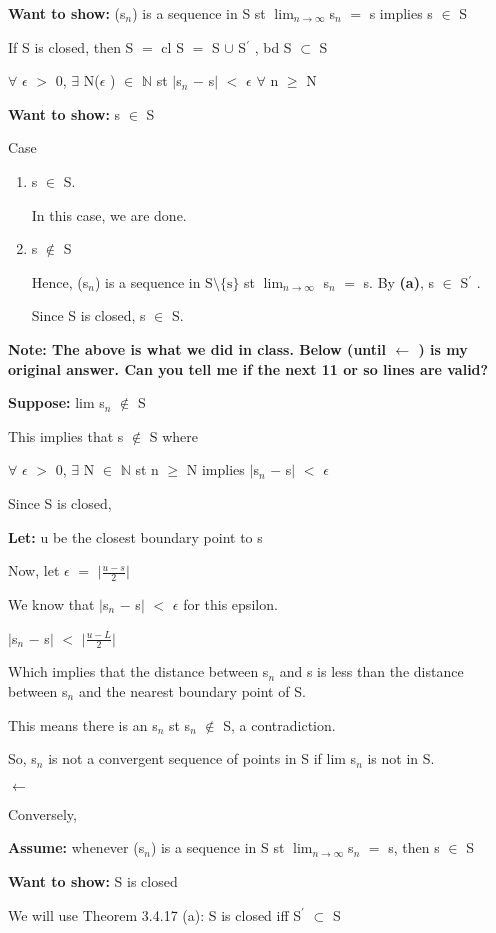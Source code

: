 \documentclass{article}
\newcommand{\mt}[1]{\ensuremath{#1}}
\newcommand{\elist}{\end{enumerate}}
\newcommand{\bilist}{\begin{enumerate}[label=\roman*)]}
\newcommand{\lt}[1]{\textbf{Let: } #1}
\newcommand{\supp}[1]{\textbf{Suppose: } #1}
\newcommand{\wts}[1]{\textbf{Want to show: } #1}
\newcommand{\as}[1]{\textbf{Assume: } #1}
\newcommand{\bpth}[1]{\textbf{(#1)}}
\newcommand{\bn}{\mt{\mathbb{N}} }       %
\newcommand{\ep}{\mt{\epsilon} }         %
\newcommand{\fa}{\mt{\forall} }          %
\newcommand{\mem}{\mt{\in} }
\newcommand{\exs}{\mt{\exists} }
\newcommand{\sbs}{\mt{\subset} }         %
\newcommand{\lla}{ \mt{\longleftarrow} }  %
\newcommand{\av}[1]{\mt{|}#1\mt{|}}  %
\newcommand{\prn}[1]{(#1)}
\newcommand{\bk}[1]{\{#1\}}
\newcommand{\ms}{\mt{-} }
\newcommand{\ls}{\mt{<} }
\newcommand{\gr}{\mt{>} }
\newcommand{\gre}{\mt{\geq} }
\newcommand{\eql}{\mt{=} }
\newcommand{\pr}{\mt{^\prime} } 		   %
\newcommand{\uw}[2]{#1\mt{_{#2}}}
\newcommand{\frc}[2]{\mt{\frac{#1}{#2}}}
\newcommand{\lmti}[1]{\mt{\displaystyle{\lim_{#1 \to \infty}}}}
\newcommand{\bnt}[2]{\mt{\textrm{#1}\setminus{\textrm{#2}}}}
\begin{document}
{	\wts{\prn{\uw{s}{n}} is a sequence in S st \lmti{n}\uw{s}{n} \eql s implies s \mem S}
	
	If S is closed, then S \eql cl S \eql S $\cup$ S\pr, bd S \sbs S
	
	\fa \ep \gr 0, \exs N(\ep) \mem \bn st \av{\uw{s}{n} \ms s} \ls \ep \fa n \gre N
	
	\wts{s \mem S}
	
	Case
	
	\bilist
	\item s \mem S.
		
		In this case, we are done.
	\item s $\not\in$ S
		
		Hence, \prn{\uw{s}{n}} is a sequence in \bnt{S}{\bk{s}}  st \lmti{n} \uw{s}{n} \eql s. By \bpth{a}, s \mem S\pr. 
		
		Since S is closed, s \mem S.
	\elist
	
	\textbf{Note: The above is what we did in class. Below (until \lla) is my original answer. Can you tell me if the next 11 or so lines are valid?}
	
	\supp{lim \uw{s}{n} $\not\in$ S}
	
	This implies that s $\not\in$ S where
	
	\fa \ep \gr 0, \exs N \mem \bn st n \gre N implies \av{\uw{s}{n} \ms s} \ls \ep
	
	Since S is closed,
	
	\lt{u be the closest boundary point to s}
	
	Now, let \ep \eql \av{\frc{u \ms s}{2}}
	
	We know that \av{\uw{s}{n} \ms s} \ls \ep for this epsilon.
	
	\av{\uw{s}{n} \ms s} \ls \av{\frc{u \ms L}{2}}
	
	Which implies that the distance between \uw{s}{n} and s is less than the distance between \uw{s}{n} and the nearest boundary point of S.
	
	This means there is an \uw{s}{n} st \uw{s}{n} $\not\in$ S, a contradiction.
	
	So, \uw{s}{n} is not a convergent sequence of points in S if lim \uw{s}{n} is not in S. 
	
	\lla
	
	Conversely, 
	
	\as{whenever \prn{\uw{s}{n}} is a sequence in S st \lmti{n}\uw{s}{n} \eql s, then s \mem S}
	
	\wts{S is closed}
	
	We will use Theorem 3.4.17 (a): S is closed iff S\pr \sbs S
	
}
\end{document}
